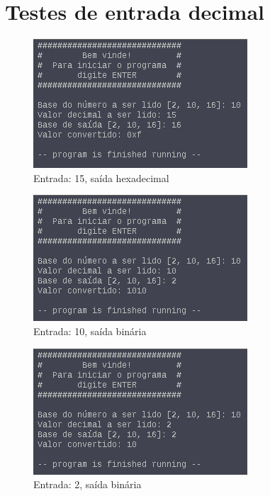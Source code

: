 \documentclass{article}
\begin{document}
\section{Testes de entrada decimal}

\begin{figure}[H]
  \includegraphics[width=\linewidth]{./CasoDec1}
  \caption{Entrada: 15, saída hexadecimal}
  \label{fig:dec1}
\end{figure}

\begin{figure}[H]
  \includegraphics[width=\linewidth]{./CasoDec2}
  \caption{Entrada: 10, saída binária}
  \label{fig:dec2}
\end{figure}

\begin{figure}[H]
  \includegraphics[width=\linewidth]{./CasoDec3}
  \caption{Entrada: 2, saída binária}
  \label{fig:dec3}
\end{figure}
\end{document}
